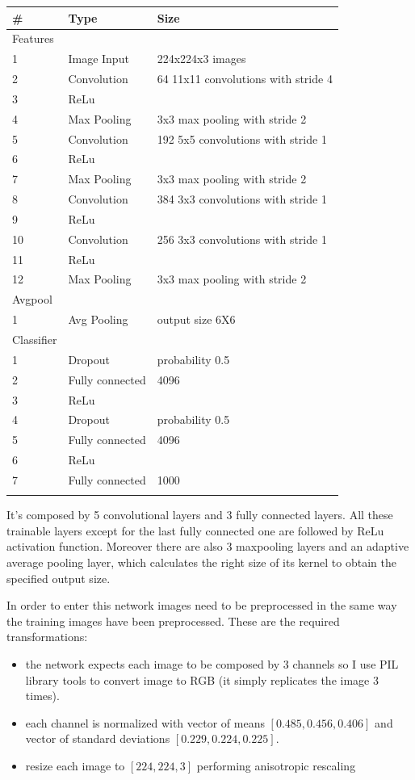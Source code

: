\documentclass[12pt, a4paper]{report}
\begin{document}
\begin{table}[h!]
	\centering
	\begin{tabular}{lll}
		\# & Type & Size \\
		\midrule
		Features & & \\
		1 & Image Input & 224x224x3 images \\
		2 & Convolution & 64 11x11 convolutions with stride 4 \\
		3 & ReLu & \\
		4 & Max Pooling & 3x3 max pooling with stride 2 \\
		5 & Convolution & 192 5x5 convolutions with stride 1 \\
		6 & ReLu & \\
		7 & Max Pooling & 3x3 max pooling with stride 2 \\
		8 & Convolution & 384 3x3 convolutions with stride 1 \\
		9 & ReLu & \\
		10 & Convolution & 256 3x3 convolutions with stride 1 \\
		11 & ReLu & \\
		12 & Max Pooling & 3x3 max pooling with stride 2 \\
		\midrule
		Avgpool & & \\
		1 & Avg Pooling & output size 6X6\\
		\midrule
		Classifier & & \\
		1 & Dropout & probability 0.5 \\
		2 & Fully connected & 4096 \\
		3 & ReLu & \\
		4 & Dropout & probability 0.5 \\
		5 & Fully connected & 4096 \\
		6 & ReLu & \\
		7 & Fully connected & 1000 \\
		\bottomrule
		\label{tab:baseline}
	\end{tabular}
\end{table}

It's composed by 5 convolutional layers and 3 fully connected layers. All these trainable layers except for the last fully connected one are followed by ReLu activation function. Moreover there are also 3 maxpooling layers and an adaptive average pooling layer, which calculates the right size of its kernel to obtain the specified output size.

In order to enter this network images need to be preprocessed in the same way the training images have been preprocessed. These are the required transformations:
\begin{itemize}
	\item the network expects each image to be composed by 3 channels so I use PIL library tools to convert image to RGB (it simply replicates the image 3 times).
	\item each channel is normalized with vector of means $[0.485, 0.456, 0.406]$ and vector of standard deviations $[0.229, 0.224, 0.225]$.
	\item resize each image to $[224,224,3]$ performing anisotropic rescaling
\end{itemize}
\end{document}

